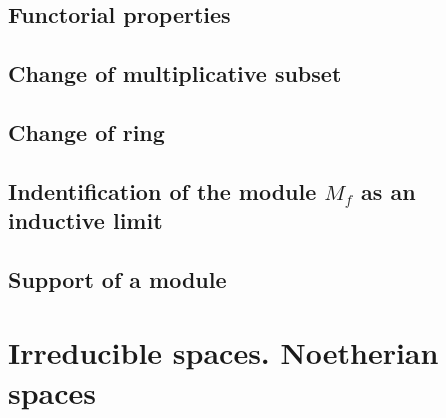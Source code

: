 \documentclass{book}
\begin{document}
        \label{0-prelim-1.2}

        



        \subsection{Functorial properties}

        \label{0-prelim-1.3}

        



        \subsection{Change of multiplicative subset}

        \label{0-prelim-1.4}

        



        \subsection{Change of ring}

        \label{0-prelim-1.5}

        



        \subsection{Indentification of the module $M_f$ as an inductive limit}

        \label{0-prelim-1.6}

        



        \subsection{Support of a module}

        \label{0-prelim-1.7}

        



    \section{Irreducible spaces. Noetherian spaces}
\end{document}
